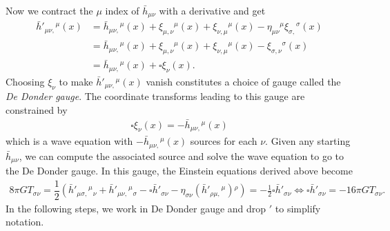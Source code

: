 \documentclass[10pt, a4paper]{article}
\begin{document}
\begin{enumerate}
\begin{align*}
  \end{align*}
  Now we contract the $\mu$ index of $\bar{h}_{\mu \nu}$ with a derivative and get
  \begin{align*}
    \bar{h}'{}_{\mu \nu,}{}^{\mu}(x) &=  \bar{h}{}_{\mu \nu,}{}^{\mu}(x) + \xi_{\mu,\nu}{}^{\mu}(x) + \xi_{\nu,\mu}{}^{\mu}(x) - \eta_{\mu \nu}{}^{\mu} \xi_{\sigma,}{}^{\sigma}(x)\\
    &=  \bar{h}{}_{\mu \nu,}{}^{\mu}(x) + \xi_{\mu,\nu}{}^{\mu}(x) + \xi_{\nu,\mu}{}^{\mu}(x) -  \xi_{\sigma,\nu}{}^{\sigma}(x)\\
    &= \bar{h}{}_{\mu \nu,}{}^{\mu}(x) + \square \xi_{\nu}(x). 
  \end{align*} 
Choosing $\xi_\nu$ to make $\bar{h}'{}_{\mu \nu,}{}^{\mu}(x)$ vanish constitutes a choice of gauge called the \textit{De Donder gauge}. The coordinate transforms leading to this gauge are constrained by 
\begin{align*}
  \square \xi_{\nu}(x) = -\bar{h}{}_{\mu \nu,}{}^{\mu}(x) 
\end{align*}
which is a wave equation with $-\bar{h}{}_{\mu \nu,}{}^{\mu}(x)$ sources for each $\nu$. Given any starting $\bar{h}_{\mu \nu}$, we can compute the associated source and solve the wave equation to go to the De Donder gauge. In this gauge, the Einstein equations derived above become 
\begin{align*}
  8\pi G T_{\sigma \nu} = \dfrac{1}{2}(\bar{h}'_{\mu\sigma,}{}^\mu{}_\nu + \bar{h}'_{\mu\nu,}{}^\mu{}_\sigma -\square\bar{h}'_{\sigma\nu} -\eta_{\sigma\nu}(\bar{h}'_{\rho\mu,}{}^{\mu}){}^{\rho}) = -\frac{1}{2}\square\bar{h}'_{\sigma\nu} \iff \square\bar{h}'_{\sigma\nu} = -16\pi G T_{\sigma \nu}.
\end{align*}
In the following steps, we work in De Donder gauge and drop $'$ to simplify notation. 
\end{enumerate}


\newpage
\end{document}
